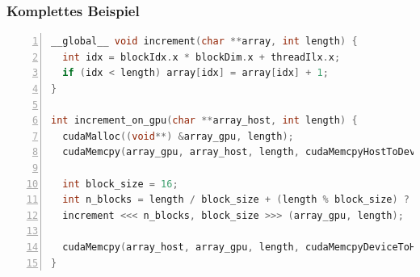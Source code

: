 \subsubsection{Komplettes Beispiel}
\begin{lstlisting}[frame=single,numbers=left,mathescape,language=C]
__global__ void increment(char **array, int length) {
  int idx = blockIdx.x * blockDim.x + threadIlx.x;
  if (idx < length) array[idx] = array[idx] + 1;
}

int increment_on_gpu(char **array_host, int length) {
  cudaMalloc((void**) &array_gpu, length);
  cudaMemcpy(array_gpu, array_host, length, cudaMemcpyHostToDevice);

  int block_size = 16;
  int n_blocks = length / block_size + (length % block_size) ? 1 : 0;
  increment <<< n_blocks, block_size >>> (array_gpu, length);

  cudaMemcpy(array_host, array_gpu, length, cudaMemcpyDeviceToHost);
}
\end{lstlisting}


